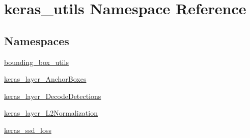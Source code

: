 \hypertarget{namespacekeras__utils}{}\section{keras\+\_\+utils Namespace Reference}
\label{namespacekeras__utils}
\subsection*{Namespaces}
\begin{DoxyCompactItemize}
\item 
 \hyperlink{namespacekeras__utils_1_1bounding__box__utils}{bounding\+\_\+box\+\_\+utils}
\item 
 \hyperlink{namespacekeras__utils_1_1keras__layer___anchor_boxes}{keras\+\_\+layer\+\_\+\+Anchor\+Boxes}
\item 
 \hyperlink{namespacekeras__utils_1_1keras__layer___decode_detections}{keras\+\_\+layer\+\_\+\+Decode\+Detections}
\item 
 \hyperlink{namespacekeras__utils_1_1keras__layer___l2_normalization}{keras\+\_\+layer\+\_\+\+L2\+Normalization}
\item 
 \hyperlink{namespacekeras__utils_1_1keras__ssd__loss}{keras\+\_\+ssd\+\_\+loss}
\end{DoxyCompactItemize}

